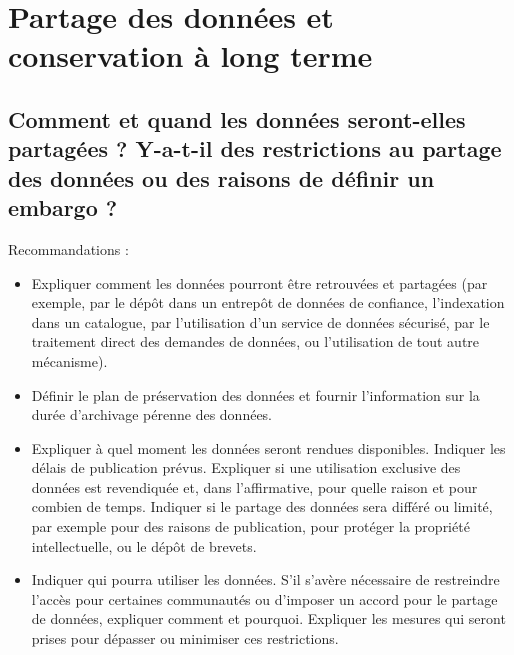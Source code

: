 \documentclass{article}
\begin{document}
\section{Partage des données et conservation à long terme}
\subsection{Comment et quand les données seront-elles partagées ? Y-a-t-il des restrictions au partage des données ou des raisons de définir un embargo ?}
Recommandations :
\begin{itemize}
    \item Expliquer comment les données pourront être retrouvées et partagées (par exemple, par le dépôt dans un entrepôt de données de confiance, l'indexation dans un catalogue, par l’utilisation d'un service de données sécurisé, par le traitement direct des demandes de données, ou l'utilisation de tout autre mécanisme).
    \item Définir le plan de préservation des données et fournir l’information sur la durée d’archivage pérenne des données.
    \item Expliquer à quel moment les données seront rendues disponibles. Indiquer les délais de publication prévus. Expliquer si une utilisation exclusive des données est revendiquée et, dans l'affirmative, pour quelle raison et pour combien de temps. Indiquer si le partage des données sera différé ou limité, par exemple pour des raisons de publication, pour protéger la propriété intellectuelle, ou le dépôt de brevets.
    \item Indiquer qui pourra utiliser les données. S'il s’avère nécessaire de restreindre l'accès pour certaines communautés ou d’imposer un accord pour le partage de données, expliquer comment et pourquoi. Expliquer les mesures qui seront prises pour dépasser ou minimiser ces restrictions.
\end{itemize}
\end{document}
